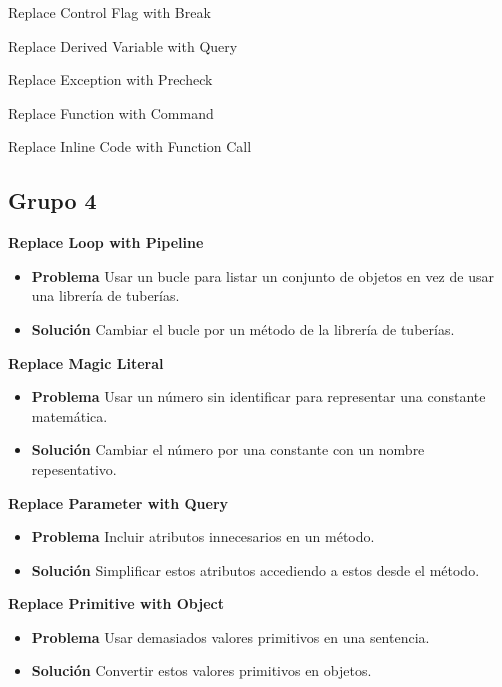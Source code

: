 \documentclass[11pt,a4paper,oneside]{book}
\begin{document}
Replace Control Flag with Break

Replace Derived Variable with Query

Replace Exception with Precheck

Replace Function with Command

Replace Inline Code with Function Call

\subsection{Grupo 4}
\textbf{Replace Loop with Pipeline}
\label{ReplaceLoopWithPipeline}
\begin{itemize}
    \item \textbf{Problema} Usar un bucle para listar un conjunto de objetos en vez de usar una librería de tuberías.
    
    
    \item \textbf{Solución} Cambiar el bucle por un método de la librería de tuberías.
    
\end{itemize}

\textbf{Replace Magic Literal}
\label{ReplaceMagicLiteral}
\begin{itemize}
    \item \textbf{Problema} Usar un número sin identificar para representar una constante matemática.
    
    
    \item \textbf{Solución} Cambiar el número por una constante con un nombre repesentativo.
    
\end{itemize}

\textbf{Replace Parameter with Query}
\label{ReplaceParameterWithQuery}
\begin{itemize}
    \item \textbf{Problema} Incluir atributos innecesarios en un método.
    
    
    \item \textbf{Solución} Simplificar estos atributos accediendo a estos desde el método.
    
\end{itemize}

\textbf{Replace Primitive with Object}
\label{ReplacePrimitiveWithObject}
\begin{itemize}
    \item \textbf{Problema} Usar demasiados valores primitivos en una sentencia.
    
    
    \item \textbf{Solución} Convertir estos valores primitivos en objetos.
    
\end{itemize}
\end{document}
